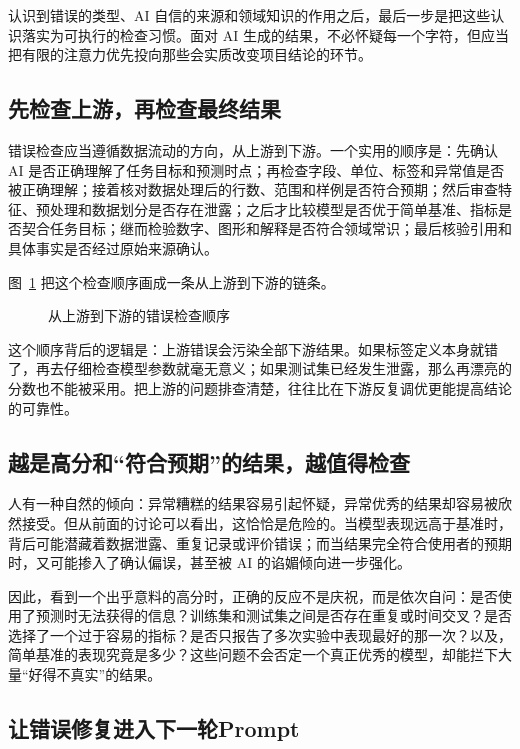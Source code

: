 认识到错误的类型、AI 自信的来源和领域知识的作用之后，最后一步是把这些认识落实为可执行的检查习惯。面对 AI 生成的结果，不必怀疑每一个字符，但应当把有限的注意力优先投向那些会实质改变项目结论的环节。

\subsection{先检查上游，再检查最终结果}

错误检查应当遵循数据流动的方向，从上游到下游。一个实用的顺序是：先确认 AI 是否正确理解了任务目标和预测时点；再检查字段、单位、标签和异常值是否被正确理解；接着核对数据处理后的行数、范围和样例是否符合预期；然后审查特征、预处理和数据划分是否存在泄露；之后才比较模型是否优于简单基准、指标是否契合任务目标；继而检验数字、图形和解释是否符合领域常识；最后核验引用和具体事实是否经过原始来源确认。

图~\ref{fig:ch12_order} 把这个检查顺序画成一条从上游到下游的链条。

\begin{figure}[H]
  \centering
  \caption{从上游到下游的错误检查顺序}
  \label{fig:ch12_order}
\end{figure}

这个顺序背后的逻辑是：上游错误会污染全部下游结果。如果标签定义本身就错了，再去仔细检查模型参数就毫无意义；如果测试集已经发生泄露，那么再漂亮的分数也不能被采用。把上游的问题排查清楚，往往比在下游反复调优更能提高结论的可靠性。

\subsection{越是高分和“符合预期”的结果，越值得检查}

人有一种自然的倾向：异常糟糕的结果容易引起怀疑，异常优秀的结果却容易被欣然接受。但从前面的讨论可以看出，这恰恰是危险的。当模型表现远高于基准时，背后可能潜藏着数据泄露、重复记录或评价错误；而当结果完全符合使用者的预期时，又可能掺入了确认偏误，甚至被 AI 的谄媚倾向进一步强化。

因此，看到一个出乎意料的高分时，正确的反应不是庆祝，而是依次自问：是否使用了预测时无法获得的信息？训练集和测试集之间是否存在重复或时间交叉？是否选择了一个过于容易的指标？是否只报告了多次实验中表现最好的那一次？以及，简单基准的表现究竟是多少？这些问题不会否定一个真正优秀的模型，却能拦下大量“好得不真实”的结果。

\subsection{让错误修复进入下一轮Prompt}

